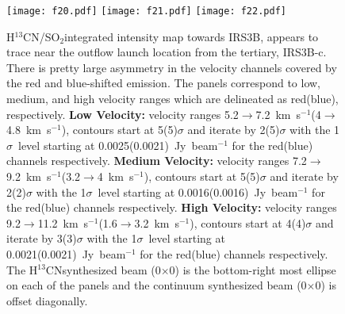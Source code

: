 \documentclass[twocolumn, 12pt]{aastex63}
\newcommand{\htcn}{H$^{13}$CN}
\newcommand{\sot}{SO$_{2}$}
\newcommand{\kms}{km~s$^{-1}$}
\newcommand{\htcnbeam}{0\farcs22$\times$0\farcs14}
\newcommand{\contbeam}{0\farcs11$\times$0\farcs05}
\begin{document}
\begin{figure}[H]
\begin{center}
   \texttt{[image: f20.pdf]}
   \texttt{[image: f21.pdf]}
   \texttt{[image: f22.pdf]}
\end{center}
   \caption{\htcn/\sot\space integrated intensity map towards IRS3B, appears to trace near the outflow launch location from the tertiary, IRS3B-c. There is pretty large asymmetry in the velocity channels covered by the red and blue-shifted emission. The panels correspond to low, medium, and high velocity ranges which are delineated as red(blue), respectively. \textbf{Low Velocity:} velocity ranges 5.2$\rightarrow$7.2~\kms (4$\rightarrow$4.8~\kms), contours start at 5(5)$\sigma$ and iterate by 2(5)$\sigma$ with the 1$\sigma$~level starting at 0.0025(0.0021)~Jy~beam$^{-1}$ for the red(blue) channels respectively. \textbf{Medium Velocity:} velocity ranges 7.2$\rightarrow$9.2~\kms (3.2$\rightarrow$4~\kms), contours start at 5(5)$\sigma$ and iterate by 2(2)$\sigma$ with the 1$\sigma$~level starting at 0.0016(0.0016)~Jy~beam$^{-1}$ for the red(blue) channels respectively. \textbf{High Velocity:} velocity ranges 9.2$\rightarrow$11.2~\kms (1.6$\rightarrow$3.2~\kms), contours start at 4(4)$\sigma$ and iterate by 3(3)$\sigma$ with the 1$\sigma$~level starting at 0.0021(0.0021)~Jy~beam$^{-1}$ for the red(blue) channels respectively. The \htcn\space synthesized beam (\htcnbeam) is the bottom-right most ellipse on each of the panels and the continuum synthesized beam (\contbeam) is offset diagonally.}\label{fig:irs3bh13cnmoment}
\end{figure}
\end{document}
